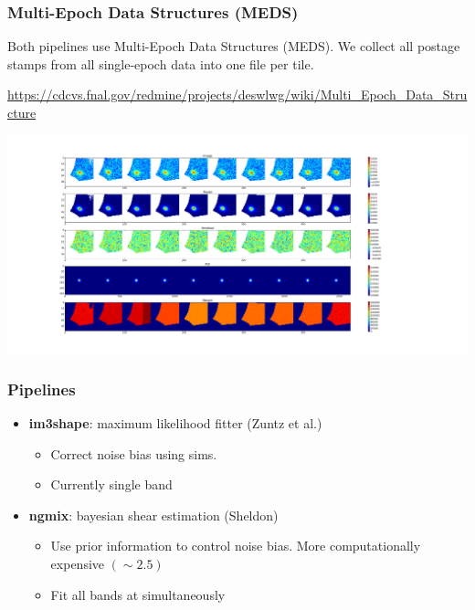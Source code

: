 \documentclass{beamer}
\newcommand{\ngmix}{{\bf ngmix}}
\newcommand{\imshape}{{\bf im3shape}}
\begin{document}
\frame
{
    \frametitle{Multi-Epoch Data Structures (MEDS)}

    {\small

        Both pipelines use Multi-Epoch Data Structures (MEDS).  We collect all
        postage stamps from all single-epoch data into one file per tile.
    }
    {\tiny

        \url{https://cdcvs.fnal.gov/redmine/projects/deswlwg/wiki/Multi_Epoch_Data_Structure}
    }
    \begin{center}
        \includegraphics[width=1.2\textwidth]{resid-im3shape-2929660524.png}
    \end{center}

}


\frame
{
    \frametitle{Pipelines}


    \begin{itemize}
        \item \imshape: maximum likelihood fitter (Zuntz et al.)
            \begin{itemize}
                \item Correct noise bias using sims.
                \item Currently single band
            \end{itemize}
        \item \ngmix: bayesian shear estimation (Sheldon)
            \begin{itemize}

                \item Use prior information to control noise bias. More computationally expensive $(\sim 2.5)$

                \item Fit all bands at simultaneously
            \end{itemize}

    \end{itemize}


}
\end{document}
